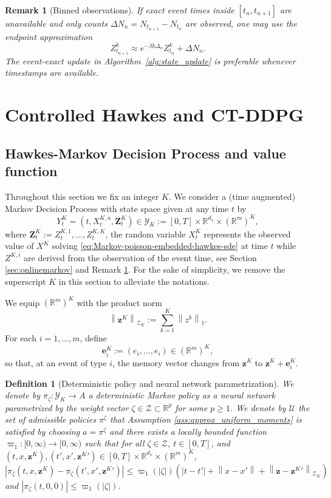 \documentclass[11pt]{article}
\theoremstyle{remarkitalic}
\newtheorem{definition}[theorem]{Definition}
\theoremstyle{remarkitalic}
\newtheorem{remark}[theorem]{Remark}
\newcommand{\R}{\mathbb R}
\newcommand{\1}{\mathbf 1}
\newcommand{\norm}[1]{\left\lVert #1 \right\rVert}
\begin{document}
\begin{remark}[Binned observations]\label{rem:binned}
If exact event times inside $[t_n,t_{n+1}]$ are unavailable and only counts $\Delta N_n=N_{t_{n+1}}-N_{t_n}$ are observed, one may use the endpoint approximation
\[
    Z_{t_{n+1}}^k\approx e^{-\beta k\Delta_n}Z_{t_n}^k+\Delta N_n.
\]
The event-exact update in Algorithm~\ref{alg:state_update} is preferable whenever timestamps are available.
\end{remark}


\section{Controlled Hawkes and CT-DDPG}
\label{sec:ctddpg}
\subsection{Hawkes-Markov Decision Process and value function}
Throughout this section we fix an integer $K$. We consider a (time augmented) Markov Decision Process with state space given at any time $t$ by
\[
    Y_t^K=(t,X_t^{K,a},\mathbf Z^K_t)
    \in
\mathcal Y_K:=[0,T]\times \R^{d_x}\times(\R^m)^K,
\]
where $\mathbf Z^K_t:=Z_t^{K,1},\dots,Z_t^{K,K}$,
the random variable $X^K_t$ represents the observed value of $X^K$ solving \eqref{eq:Markov-poisson-embedded-hawkes-sde} at time $t$ while $Z^{K,i}$ are derived from the observation of the event time, see Section \ref{sec:onlinemarkov} and Remark \ref{rem:binned}. For the sake of simplicity, we remove the superscript $K$ in this section to alleviate the notations. 

We equip $(\mathbb R^m)^K$ with the product norm
\[
    \norm{\mathbf z^K}_{\mathcal Z_K}
    :=
    \sum_{k=1}^K\norm{z^k}_1.
\]
For each $i=1,\ldots,m$, define
\[
    \mathbf e_i^K
    :=
    (e_i,\ldots,e_i)
    \in(\mathbb R^m)^K,
\]
so that, at an event of type $i$, the memory vector changes from
$\mathbf z^K$ to $\mathbf z^K+\mathbf e_i^K$.

\begin{definition}[Deterministic policy and neural network parametrization]
    \label{def:policy}
    We denote by $\pi_\zeta:\mathcal Y_K\longrightarrow A$ a deterministic Markov policy as a neural network parametrized by the weight vector $\zeta\in \mathcal Z\subset \mathbb R^p$ for some $p\geq 1$. We denote by $\mathcal U$ the set of admissible policies $\pi^\zeta$  that Assumption \ref{ass:approx_uniform_moments} is satisfied by choosing $a=\pi^\zeta$ and 
    there exists a locally bounded function $\varpi_1 : [0, \infty) \to [0, \infty)$ such that for all $\zeta \in \mathcal Z$, $t \in [0, T]$, and $(t,x,\mathbf z^K),(t',x',{\mathbf z^K}') \in [0,T]\times\R^{d_x}\times(\R^m)^K$,
\[
    |\pi_\zeta(t,x,\mathbf z^K) - \pi_\zeta(t',x',{\mathbf z^K}')| \le \varpi_1(|\zeta|)\left(|t-t'|+\norm{x-x'}+\norm{\mathbf z-{\mathbf z^K}'}_{\mathcal Z_K}\right)\] and $|\pi_\zeta(t, 0,0)| \le \varpi_1(|\zeta|)$.

\end{definition}
\end{document}
